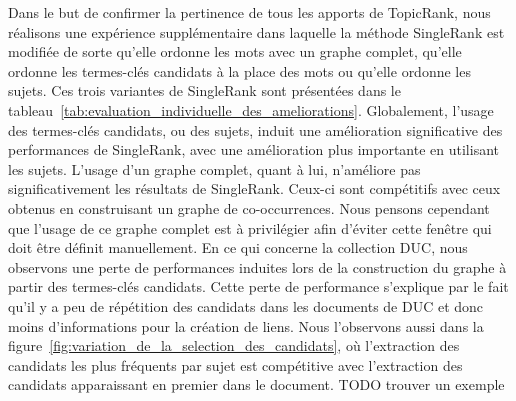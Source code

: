     Dans le but de confirmer la pertinence de tous les apports de TopicRank,
    nous réalisons une expérience supplémentaire dans laquelle la méthode
    SingleRank est modifiée de sorte qu'elle ordonne les mots avec un graphe
    complet, qu'elle ordonne les termes-clés candidats à la place des mots ou
    qu'elle ordonne les sujets. Ces trois variantes de SingleRank sont
    présentées dans le
    tableau~\ref{tab:evaluation_individuelle_des_ameliorations}. Globalement,
    l'usage des termes-clés candidats, ou des sujets, induit une amélioration
    significative des performances de SingleRank, avec une amélioration plus
    importante en utilisant les sujets. L'usage d'un graphe complet, quant à
    lui, n'améliore pas significativement les résultats de SingleRank. Ceux-ci
    sont compétitifs avec ceux obtenus en construisant un graphe de
    co-occurrences. Nous pensons cependant que l'usage de ce graphe complet est
    à privilégier afin d'éviter cette fenêtre qui doit être définit
    manuellement. En ce qui concerne la collection DUC, nous observons une perte
    de performances induites lors de la construction du graphe à partir des
    termes-clés candidats. Cette perte de performance s'explique par le fait
    qu'il y a peu de répétition des candidats dans les documents de DUC et donc
    moins d'informations pour la création de liens. Nous l'observons aussi dans
    la figure~\ref{fig:variation_de_la_selection_des_candidats}, où l'extraction
    des candidats les plus fréquents par sujet est compétitive avec l'extraction
    des candidats apparaissant en premier dans le document.
    TODO trouver un exemple
